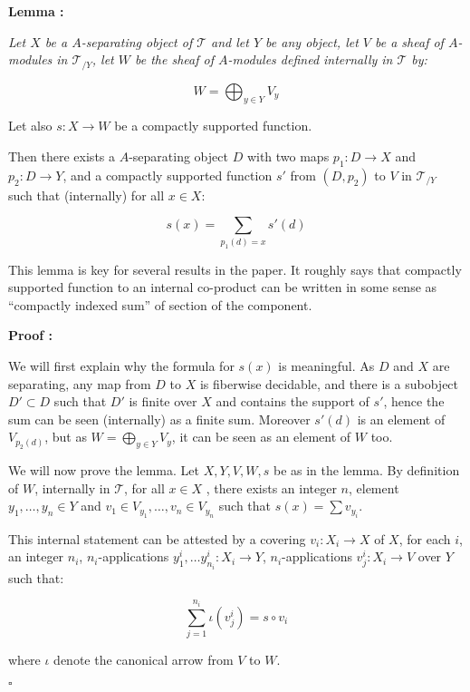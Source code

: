 \documentclass[a4paper]{article}
\newcommand{\Tcal}{\mathcal{T}}
\newcommand{\block}[1]
{

\par \subsubsection{} #1

\bigskip}
\newcommand{\Lem}[1]
	{

	\bigskip
	
	\textbf{Lemma : }{\itshape #1}
		
	\bigskip
	
	}
\newcommand{\Dem}[1]{
	
	\smallskip
	
	\textbf{Proof : } \par
	 {#1} $\square$
	 
	 \bigskip
}
\begin{document}
\block{\label{Lem_gammac_indexedcoprod}\Lem{Let $X$ be a $A$-separating object of $\Tcal$ and let $Y$ be any object, let $V$ be a sheaf of $A$-modules in $\Tcal_{/Y}$, let $W$ be the sheaf of $A$-modules defined internally in $\Tcal$ by:

\[ W= \bigoplus_{y \in Y} V_y \]

Let also $s:X \rightarrow W$ be a compactly supported function.

Then there exists a $A$-separating object $D$ with two maps $p_1 :D \rightarrow X$ and $p_2: D \rightarrow Y$, and a compactly supported function $s'$ from $(D,p_2)$ to $V$ in $\Tcal_{/Y}$ such that (internally) for all $x \in X$:

\[ s(x) = \sum_{p_1(d)=x} s'(d)  \]

}


\bigskip

This lemma is key for several results in the paper. It roughly says that compactly supported function to an internal co-product can be written in some sense as ``compactly indexed sum'' of section of the component.


\Dem{We will first explain why the formula for $s(x)$ is meaningful. As $D$ and $X$ are separating, any map from $D$ to $X$ is fiberwise decidable, and there is a subobject $D' \subset D$ such that $D'$ is finite over $X$ and contains the support of $s'$, hence the sum can be seen (internally) as a finite sum. Moreover $s'(d)$ is an element of $V_{p_2(d)}$, but as $W= \bigoplus_{y\in Y} V_y$, it can be seen as an element of $W$ too. 


We will now prove the lemma. Let $X,Y,V,W,s$ be as in the lemma. By definition of $W$, internally in $\Tcal$, for all $x \in X$ , there exists an integer $n$, element $y_1, \dots ,y_n \in Y$ and $v_1 \in V_{y_1}, \dots, v_n \in V_{y_n}$ such that $s(x) = \sum v_{y_i}$.

This internal statement can be attested by a covering $v_i: X_i \rightarrow X$ of $X$, for each $i$, an integer $n_i$, $n_i$-applications $y^i_1, \dots y^i_{n_i} : X_i \rightarrow Y$, $n_i$-applications $v^i_j: X_i \rightarrow V$ over $Y$ such that:

\[ \sum_{j=1}^{n_i} \iota(v^i_j) = s \circ v_i \]

where $\iota$ denote the canonical arrow from $V$ to $W$.

}}
\end{document}
